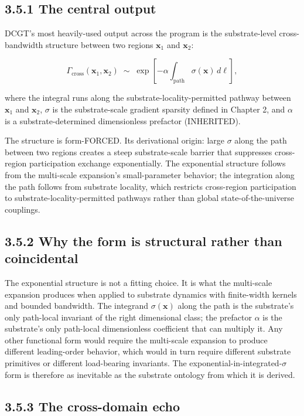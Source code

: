 \documentclass[11pt]{book}
\begin{document}
\subsection{3.5.1 The central output}

DCGT's most heavily-used output across the program is the substrate-level cross-bandwidth structure between two regions $\mathbf{x}_1$ and $\mathbf{x}_2$:

\[
\Gamma_\mathrm{cross}(\mathbf{x}_1, \mathbf{x}_2) \;\sim\; \exp\!\left[-\alpha\!\int_\mathrm{path}\sigma(\mathbf{x})\,d\ell\right],
\]

where the integral runs along the substrate-locality-permitted pathway between $\mathbf{x}_1$ and $\mathbf{x}_2$, $\sigma$ is the substrate-scale gradient sparsity defined in Chapter 2, and $\alpha$ is a substrate-determined dimensionless prefactor (INHERITED).

The structure is form-FORCED. Its derivational origin: large $\sigma$ along the path between two regions creates a steep substrate-scale barrier that suppresses cross-region participation exchange exponentially. The exponential structure follows from the multi-scale expansion's small-parameter behavior; the integration along the path follows from substrate locality, which restricts cross-region participation to substrate-locality-permitted pathways rather than global state-of-the-universe couplings.

\subsection{3.5.2 Why the form is structural rather than coincidental}

The exponential structure is not a fitting choice. It is what the multi-scale expansion produces when applied to substrate dynamics with finite-width kernels and bounded bandwidth. The integrand $\sigma(\mathbf{x})$ along the path is the substrate's only path-local invariant of the right dimensional class; the prefactor $\alpha$ is the substrate's only path-local dimensionless coefficient that can multiply it. Any other functional form would require the multi-scale expansion to produce different leading-order behavior, which would in turn require different substrate primitives or different load-bearing invariants. The exponential-in-integrated-$\sigma$ form is therefore as inevitable as the substrate ontology from which it is derived.

\subsection{3.5.3 The cross-domain echo}
\end{document}
